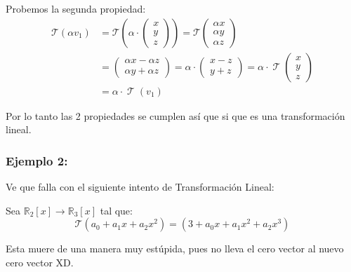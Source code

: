 \documentclass[12pt, fleqn]{report}                             %
\theoremstyle{break}                                            %
\DeclareMathOperator \LinTrans      {\mathcal{T}}               %
\newcommand{\Wrap}[1]           {\left( #1 \right)}             %
\newcommand{\FnLinTrans}[1]{\mathcal{T}\Wrap{#1}}               %
\newcommand{\VecLinTrans}[1]{\mathcal{T}\pVector{#1}}           %
\newcommand{\pVector}[1]                                        %
        { \ensuremath{\begin{pmatrix}#1\end{pmatrix}} }             %
\begin{document}
                    Probemos la segunda propiedad:
                    \begin{equation*}
                    \begin{split}
                        \FnLinTrans{\alpha v_1}                                                      
                            &= \FnLinTrans{\alpha \cdot \pVector{x\\y\\z} }                      
                             = \VecLinTrans{\alpha x\\\alpha y\\\alpha z}                                   \\
                            &= \pVector{\alpha x - \alpha z\\ \alpha y + \alpha z}                                      
                             = \alpha \cdot \pVector{x-z\\y+z}                                                          
                             = \alpha \cdot \LinTrans \pVector{x\\y\\z}                                     \\
                            &= \alpha \cdot \LinTrans (v_1)                                                 
                    \end{split}
                    \end{equation*}

                    Por lo tanto las 2 propiedades se cumplen así que si que es una transformación lineal.

                \clearpage
                \subsubsection{Ejemplo 2:}

                    Ve que falla con el siguiente intento de Transformación Lineal:

                    Sea $\mathbb{R}_2[x] \to \mathbb{R}_3[x]$ tal que:
                    \begin{equation*}
                        \FnLinTrans{a_0+a_1x+a_2x^2} = \Wrap{3+a_0x+a_1x^2+a_2x^3}
                    \end{equation*}

                    Esta muere de una manera muy estúpida, pues no lleva el cero vector al nuevo cero vector XD.
\end{document}

